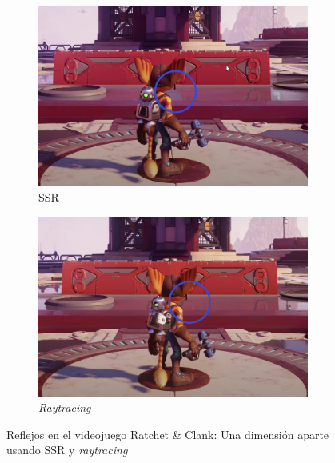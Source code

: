 \begin{figure}[!h]
     \begin{subfigure}[b]{0.49\linewidth}
        \centering
        \includegraphics[width=0.98\textwidth]{Plantilla-TFG-master/img/ssr_on.png}
        \caption{SSR}
     \end{subfigure}
     \begin{subfigure}[b]{0.49\linewidth}
        \centering
        \includegraphics[width=0.98\textwidth]{Plantilla-TFG-master/img/ssr_off.png}
        \caption{\textit{Raytracing}}
     \end{subfigure}
     \caption{Reflejos en el videojuego Ratchet \& Clank: Una dimensión aparte usando SSR y \textit{raytracing} \cite{ratchet}}
     \label{fig:ssrVS}
\end{figure}

